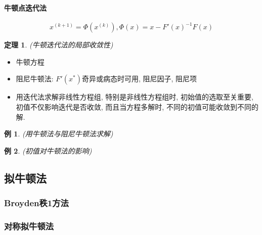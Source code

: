 \documentclass[twoside]{article}
\newtheorem{theorem}{定理}[section]
\newtheorem{eg}{例}[section]
\begin{document}
\paragraph{牛顿点迭代法}
  \begin{equation}
    x^{(k+1)}=\Phi(x^{(k)}), \Phi(x)=x - {F'(x)}^{-1} F(x)
  \end{equation}
\begin{theorem}
  (牛顿迭代法的局部收敛性)
\end{theorem}
\begin{itemize}
  \item 牛顿方程
  \item 阻尼牛顿法: $F'(x^*)$奇异或病态时可用, 阻尼因子, 阻尼项
  \item 用迭代法求解非线性方程组, 特别是非线性方程组时, 初始值的选取至关重要, 初值不仅影响迭代是否收敛, 而且当方程多解时, 不同的初值可能收敛到不同的解.
\end{itemize}
\begin{eg}
  (用牛顿法与阻尼牛顿法求解)
\end{eg}
\begin{eg}
  (初值对牛顿法的影响)
\end{eg}

\subsection{拟牛顿法}
\subsubsection{Broyden秩1方法}
\subsubsection{对称拟牛顿法}
\end{document}

